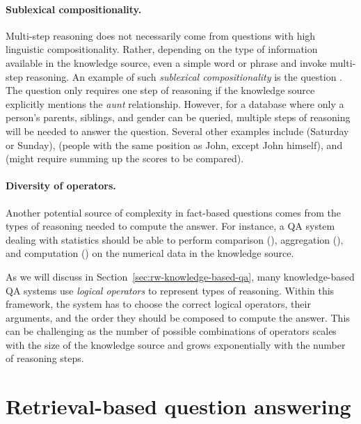 \paragraph{Sublexical compositionality.}
Multi-step reasoning does not necessarily come from
questions with high linguistic compositionality.
Rather, depending on the type of information available in
the knowledge source,
even a simple word or phrase and invoke multi-step reasoning.
An example of such \emph{sublexical compositionality}
\cite{wang2015overnight}
is the question
.
The question only requires one step of reasoning
if the knowledge source explicitly mentions the \emph{aunt} relationship.
However, for a database where only a person's parents,
siblings, and gender can be queried,
multiple steps of reasoning will be needed to answer the question.
Several other examples include
 (Saturday or Sunday),
(people with the same position as John, except John himself),
and  (might require summing up the scores to be compared).

\paragraph{Diversity of operators.}
Another potential source of complexity in fact-based questions
comes from the types of reasoning needed to compute the answer.
For instance, a QA system dealing with statistics
should be able to perform comparison
(),
aggregation
(),
and computation
()
on the numerical data in the knowledge source.

As we will discuss in Section~\ref{sec:rw-knowledge-based-qa},
many knowledge-based QA systems use \emph{logical operators}
to represent types of reasoning.
Within this framework, the system has to choose the correct
logical operators, their arguments, and the order they should be composed
to compute the answer.
This can be challenging as the number of possible combinations
of operators scales with the size of the knowledge source
and grows exponentially with the number of reasoning steps.

\section{Retrieval-based question answering}
\label{sec:rw-retrieval-based-qa}

